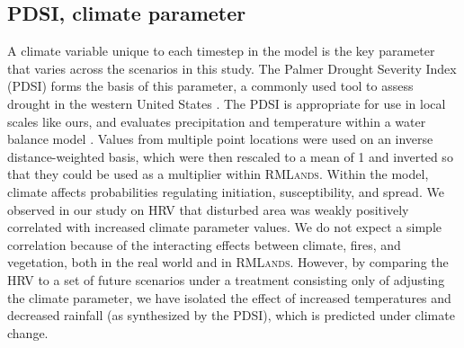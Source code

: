 \documentclass[12pt]{article}
\begin{document}
\begin{spacing}{1}
\subsection*{PDSI, climate parameter}
A climate variable unique to each timestep in the model is the key parameter that varies across the scenarios in this study. The Palmer Drought Severity Index (PDSI) forms the basis of this parameter, a commonly used tool to assess drought in the western United States \citep{Cook2004}. The PDSI is appropriate for use in local scales like ours, and evaluates precipitation and temperature within a water balance model \citep{HeimJr2002}. Values from multiple point locations were used on an inverse distance-weighted basis, which were then rescaled to a mean of 1 and inverted so that they could be used as a multiplier within \textsc{RMLands}. Within the model, climate affects probabilities regulating initiation, susceptibility, and spread. We observed in our study on HRV that disturbed area was weakly positively correlated with increased climate parameter values. We do not expect a simple correlation because of the interacting effects between climate, fires, and vegetation, both in the real world and in \textsc{RMLands}. However, by comparing the HRV to a set of future scenarios under a treatment consisting only of adjusting the climate parameter, we have isolated the effect of increased temperatures and decreased rainfall (as synthesized by the PDSI), which is predicted under climate change.


\end{spacing}
\end{document}
